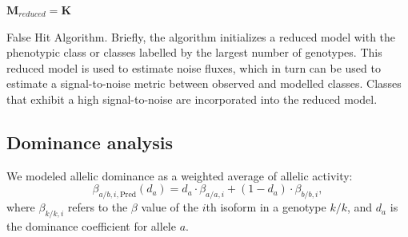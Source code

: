 \documentclass[9pt,twocolumn,twoside]{gsajnl}
\begin{document}
\begin{algorithm}[H]
  \DontPrintSemicolon{}
%
  \BlankLine{}

  $\mathbf{M}_{reduced} = \mathbf{K}$\;

  \;
  \BlankLine{}\;
  \caption{
          False Hit Algorithm. Briefly, the algorithm initializes a reduced
          model with the phenotypic class or classes labelled by the largest
          number of genotypes. This reduced model is used to estimate noise
          fluxes, which in turn can be used to estimate a signal-to-noise metric
          between observed and modelled classes. Classes that exhibit a high
          signal-to-noise are incorporated into the reduced model.
  }
\label{alg:false}
\end{algorithm}

\subsection*{Dominance analysis}
\label{subsec:dominance}
We modeled allelic dominance as a weighted average of allelic activity:
\begin{equation}
  \beta_{a/b,i,\text{Pred}}(d_a) = d_a\cdot \beta_{a/a,i} +
                                   (1-d_a)\cdot \beta_{b/b,i},
\end{equation}
where $\beta_{k/k, i}$ refers to the $\beta$ value of the $i$th isoform in a
genotype $k/k$, and $d_a$ is the dominance coefficient for allele $a$.
\end{document}
